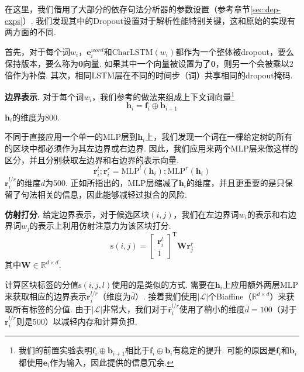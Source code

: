 在这里，我们借用了大部分\cite{Timothy-d17-biaffine}的依存句法分析器的参数设置（参考章节\ref{sec:dep-exps}）.
我们发现其中的Dropout设置对于解析性能特别关键，这和原始的实现\cite{stern-etal-2017-minimal}有两方面的不同.

首先，对于每个词$w_i$，$\mathbf{e}^{word}_i$和$\mathrm{CharLSTM}(w_i)$都作为一个整体被dropout，要么保持版本，要么称为$\mathbf{0}$向量.
如果其中一个向量被设置为了$\mathbf{0}$，则另一个会被乘以2倍作为补偿.
其次，相同LSTM层在不同的时间步（词）共享相同的dropout掩码\cite{yarin-etal-2016-dropout}.

\noindent\textbf{边界表示.}
对于每个词$w_i$，我们参考\cite{stern-etal-2017-minimal}的做法来组成上下文词向量\footnote{我们的前置实验表明$\mathbf{f}_i \oplus \mathbf{b}_{i+1}$相比于$\mathbf{f}_i \oplus \mathbf{b}_i$有稳定的提升. 可能的原因是$\mathbf{f}_i$和$\mathbf{b}_i$都使用$\mathbf{e}_i$作为输入，因此提供的信息冗余.}
\begin{equation}
    \mathbf{h}_i = \mathbf{f}_i \oplus \mathbf{b}_{i+1}
\end{equation}
$\mathbf{h}_i$的维度为800.

不同于直接应用一个单一的MLP层到$\mathbf{h}_i$上，我们发现一个词在一棵给定树的所有的区块中都必须作为其左边界或右边界.
因此，我们应用来两个MLP层来做这样的区分，并且分别获取左边界和右边界的表示向量.
\begin{equation}
    \label{mlp-borlders}
    \mathbf{r}_i^{l}; \mathbf{r}_i^{r} =\mathrm{MLP}^{l} \left( \mathbf{h}_i \right); \mathrm{MLP}^{r} \left( \mathbf{h}_i \right)
\end{equation}
$\mathbf{r}_i^{l/r}$的维度$d$为500.
正如\cite{Timothy-d17-biaffine}所指出的，MLP层缩减了$\mathbf{h}_i$的维度，并且更重要的是只保留了句法相关的信息，因此能够减轻过拟合的风险.

\noindent\textbf{仿射打分.}
给定边界表示，对于候选区块$(i,j)$，我们在左边界词$w_i$的表示和右边界词$w_j$的表示上利用仿射注意力为该区块打分.
\begin{equation} \label{eq:biaffine}
    \mathrm{s}(i,j) =  \left[
        \begin{array}{c}
            \mathbf{r}_{i}^{l} \\
            1
        \end{array}
        \right]^\mathrm{T}
    \mathbf{W} \mathbf{r}_{j}^{r}
\end{equation}
其中$\mathbf{W} \in \mathbb{R}^{d \times d}$.

计算区块标签的分值$\mathrm{s}(i,j,l)$使用的是类似的方式.
需要在$\mathbf{h}_i$上应用额外两层MLP来获取相应的边界表示$\bar{\mathbf{r}}^{l/r}_i$（维度为$\bar{d}$）.
接着我们使用$|\mathcal{L}|$个Biaffine（$\mathbb{R}^{\bar{d} \times \bar{d}}$）来获取所有标签的分值.
由于$|\mathcal{L}|$非常大，我们对于$\bar{\mathbf{r}}^{l/r}_i$使用了稍小的维度$\bar{d}=100$（对于${\mathbf{r}}^{l/r}_i$则是500）以减轻内存和计算负担.

